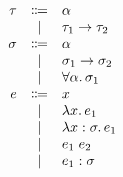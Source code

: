 \documentclass[12pt]{article}
\begin{document}
\pagestyle{empty}

\begin{align*}
    \begin{array}{rcl}
        \tau
        &\Coloneqq &\alpha \\
        &\mid &\tau_1 \to \tau_2 \\
        \sigma
        &\Coloneqq &\alpha \\
        &\mid &\sigma_1 \to \sigma_2 \\
        &\mid &\forall \alpha\ldotp \sigma_1 \\
        e
        &\Coloneqq &x \\
        &\mid &\lambda x\ldotp e_1 \\
        &\mid &\lambda x: \sigma\ldotp e_1 \\
        &\mid &e_1\; e_2 \\
        &\mid &e_1: \sigma
    \end{array}
\end{align*}
\end{document}
